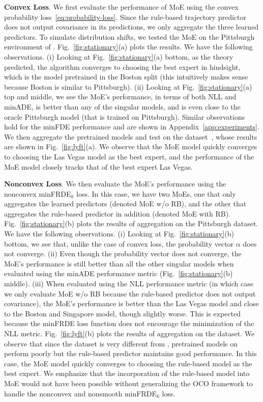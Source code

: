 {\bf Convex Loss}. 
We first evaluate the performance of MoE using the convex probability loss~\eqref{eq:probability-loss}. Since the rule-based trajectory predictor does not output covariance in its predictions, we only aggregate the three learned predictors. To simulate distribution shifts, we tested the MoE on the Pittsburgh environment of \nuscenes. Fig.~\ref{fig:stationary}(a) plots the results. We have the following observations. (i) Looking at Fig.~\ref{fig:stationary}(a) bottom, as the theory predicted, the \squint algorithm converges to choosing the best expert in hindsight, which is the model pretrained in the Boston split (this intuitively makes sense because Boston is similar to Pittsburgh). (ii) Looking at Fig.~\ref{fig:stationary}(a) top and middle, we see the MoE's performance, in terms of both NLL and minADE, is better than any of the singular models, and is even close to the oracle Pittsburgh model (that is trained on Pittsburgh). Similar observations hold for the minFDE performance and are shown in Appendix~\ref{app:experiments}. 
We then aggregate the pretrained models and test on the \lyft dataset~\cite{houston2021one}, whose results are shown in Fig.~\ref{fig:lyft}(a). We observe that the MoE model quickly converges to choosing the Las Vegas model as the best expert, and the performance of the MoE model closely tracks that of the best expert Las Vegas.

{\bf Nonconvex Loss}.
We then evaluate the MoE's performance using the nonconvex minFRDE$_k$ loss. In this case, we have two MoEs, one that only aggregates the learned predictors (denoted MoE w/o RB), and the other that aggregates the rule-based predictor in addition (denoted MoE with RB). Fig.~\ref{fig:stationary}(b) plots the results of aggregation on the Pittsburgh dataset. We have the following observations. (i) Looking at Fig.~\ref{fig:stationary}(b) bottom, we see that, unlike the case of convex loss, the probability vector $\alpha$ does not converge. (ii) Even though the probability vector does not converge, the MoE's performance is still better than all the other singular models when evaluated using the minADE performance metric (\cf Fig.~\ref{fig:stationary}(b) middle). (iii) When evaluated using the NLL performance metric (in which case we only evaluate MoE w/o RB because the rule-based predictor does not output covariance), the MoE's performance is better than the Las Vegas model and close to the Boston and Singapore model, though slightly worse. This is expected because the minFRDE loss function does not encourage the minimization of the NLL metric. Fig.~\ref{fig:lyft}(b) plots the results of aggregation on the \lyft dataset. We observe that since the \lyft dataset is very different from \nuscenes, pretrained models on \nuscenes perform poorly but the rule-based predictor maintains good performance. In this case, the MoE model quickly converges to choosing the rule-based model as the best expert. We emphasize that the incorporation of the rule-based model into MoE would not have been possible without generalizing the OCO framework to handle the nonconvex and nonsmooth minFRDE$_k$ loss.


